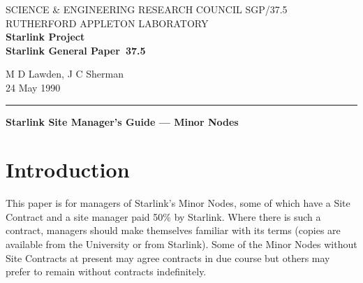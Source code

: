 \pagestyle{myheadings}

\newcommand{\stardoccategory}  {Starlink General Paper}
\newcommand{\stardocinitials}  {SGP}
\newcommand{\stardocnumber}    {37.5}
\newcommand{\stardocauthors}   {M D Lawden, J C Sherman}
\newcommand{\stardocdate}      {24 May 1990}
\newcommand{\stardoctitle}     {Starlink Site Manager's Guide --- Minor Nodes}

\newcommand{\stardocname}{\stardocinitials /\stardocnumber}
\markright{\stardocname}
\setlength{\textwidth}{160mm}
\setlength{\textheight}{240mm}
\setlength{\topmargin}{-5mm}
\setlength{\oddsidemargin}{0mm}
\setlength{\evensidemargin}{0mm}
\setlength{\parindent}{0mm}
\setlength{\parskip}{\medskipamount}
\setlength{\unitlength}{1mm}


\thispagestyle{empty}
SCIENCE \& ENGINEERING RESEARCH COUNCIL \hfill \stardocname\\
RUTHERFORD APPLETON LABORATORY\\
{\large\bf Starlink Project\\}
{\large\bf \stardoccategory\ \stardocnumber}
\begin{flushright}
\stardocauthors\\
\stardocdate
\end{flushright}
\vspace{-4mm}
\rule{\textwidth}{0.5mm}
\vspace{5mm}
\begin{center}
{\Large\bf \stardoctitle}
\end{center}
\vspace{5mm}

\setlength{\parskip}{0mm}
\tableofcontents
\setlength{\parskip}{\medskipamount}
\markright{\stardocname}

\newpage

\section {Introduction}

This paper is for managers of Starlink's Minor Nodes, some of which have a
Site Contract and a site manager paid 50\% by Starlink.
Where there is such a contract, managers should make themselves familiar with
its terms (copies are available from the University or from Starlink).
Some of the Minor Nodes without Site Contracts at present may agree contracts
in due course but others may prefer to remain without contracts indefinitely.

